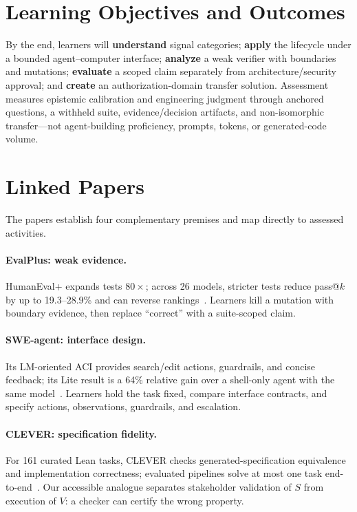 \documentclass{article}
\begin{document}
\section{Learning Objectives and Outcomes}
By the end, learners will \textbf{understand} signal categories; \textbf{apply} the lifecycle under a bounded agent--computer interface; \textbf{analyze} a weak verifier with boundaries and mutations; \textbf{evaluate} a scoped claim separately from architecture/security approval; and \textbf{create} an authorization-domain transfer solution.
Assessment measures epistemic calibration and engineering judgment through anchored questions, a withheld suite, evidence/decision artifacts, and non-isomorphic transfer---not agent-building proficiency, prompts, tokens, or generated-code volume.

\section{Linked Papers}
The papers establish four complementary premises and map directly to assessed activities.

\paragraph{EvalPlus: weak evidence.} HumanEval+ expands tests $80\times$; across 26 models, stricter tests reduce pass@$k$ by up to 19.3--28.9\% and can reverse rankings~\citep{evalplus}. Learners kill a mutation with boundary evidence, then replace ``correct'' with a suite-scoped claim.

\paragraph{SWE-agent: interface design.} Its LM-oriented ACI provides search/edit actions, guardrails, and concise feedback; its Lite result is a 64\% relative gain over a shell-only agent with the same model~\citep{sweagent}. Learners hold the task fixed, compare interface contracts, and specify actions, observations, guardrails, and escalation.

\paragraph{CLEVER: specification fidelity.} For 161 curated Lean tasks, CLEVER checks generated-specification equivalence and implementation correctness; evaluated pipelines solve at most one task end-to-end~\citep{clever}. Our accessible analogue separates stakeholder validation of $S$ from execution of $V$: a checker can certify the wrong property.
\end{document}
